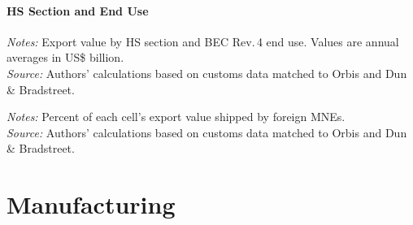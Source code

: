 \documentclass[11pt,a4paper]{article}
\begin{document}
\subsection{HS Section and End Use}
\begin{table}[H]\centering\small%
  \caption{Agriculture: Exports by HS Section and End Use}%
  \label{tab:sxe_v_agro}%
  \par\vspace{3pt}%
  \begin{minipage}{0.95\textwidth}\footnotesize %
  \textit{Notes:} Export value by HS section and BEC Rev.\,4 end use. Values are annual averages in US\$ billion.\\[3pt]%
  \textit{Source:} Authors' calculations based on customs data matched to Orbis and Dun \& Bradstreet.%
  \end{minipage}%
  \end{table}
\begin{table}[H]\centering\small%
  \caption{Agriculture: Foreign-Multinational Share of Exports by HS Section and End Use}%
  \label{tab:sxe_f_agro}%
  \par\vspace{3pt}%
  \begin{minipage}{0.95\textwidth}\footnotesize %
  \textit{Notes:} Percent of each cell's export value shipped by foreign MNEs.\\[3pt]%
  \textit{Source:} Authors' calculations based on customs data matched to Orbis and Dun \& Bradstreet.%
  \end{minipage}%
  \end{table}
\clearpage\part{Manufacturing}
\end{document}
